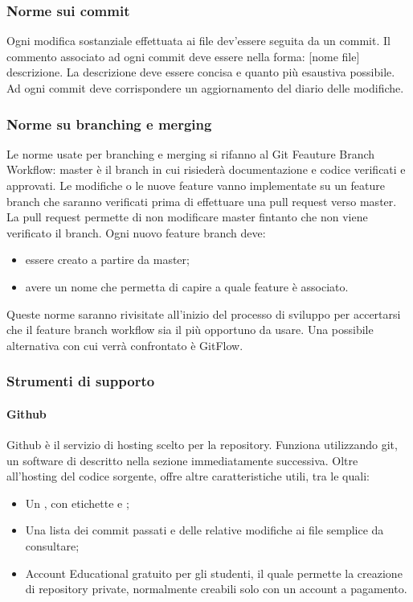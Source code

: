 \subsubsection{Norme sui commit}
Ogni modifica sostanziale effettuata ai file dev'essere seguita da un commit. Il commento associato ad ogni commit deve essere nella forma: [nome file] descrizione.
La descrizione deve essere concisa e quanto più esaustiva possibile. Ad ogni commit deve corrispondere un aggiornamento del diario delle modifiche.

\subsubsection{Norme su branching e merging}
Le norme usate per branching e merging si rifanno al Git Feauture Branch Workflow:
master è il branch in cui risiederà documentazione e codice verificati e approvati.
Le modifiche o le nuove feature vanno implementate su un feature branch che saranno verificati
prima di effettuare una pull request verso master.
La pull request permette di non modificare master fintanto che non viene verificato il branch.
Ogni nuovo feature branch deve:
\begin{itemize}
\item essere creato a partire da master;
\item avere un nome che permetta di capire a quale feature è associato.
\end{itemize}
Queste norme saranno rivisitate all'inizio del processo di sviluppo per accertarsi che il feature branch workflow sia il più opportuno da usare. Una possibile alternativa con cui verrà confrontato è GitFlow.

\subsubsection{Strumenti di supporto}
\paragraph{Github}\Spazio
Github è il servizio di hosting scelto per la repository. Funziona utilizzando git, un software di  descritto nella sezione immediatamente successiva. Oltre all'hosting del codice sorgente, offre altre caratteristiche utili, tra le quali:
\begin{itemize}
\item Un , con etichette e ;
\item Una lista dei commit passati e delle relative modifiche ai file semplice da consultare;
\item Account Educational gratuito per gli studenti, il quale permette la creazione di repository private, normalmente creabili solo con un account a pagamento.
\end{itemize}

